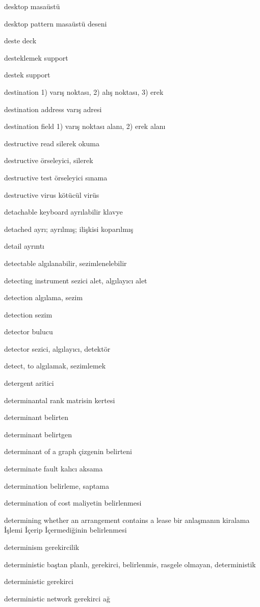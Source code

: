 \documentclass[12pt,fleqn]{article}\usepackage{../../common}
\begin{document}
desktop masaüstü

desktop pattern masaüstü deseni

deste deck

desteklemek support

destek support

destination 1) varış noktası, 2) alış noktası, 3) erek

destination address varış adresi

destination field 1) varış noktası alanı, 2) erek alanı

destructive read silerek okuma

destructive örseleyici, silerek

destructive test örseleyici sınama

destructive virus kötücül virüs

detachable keyboard ayrılabilir klavye

detached ayrı; ayrılmış; ilişkisi koparılmış

detail ayrıntı

detectable algılanabilir, sezimlenelebilir

detecting instrument sezici alet, algılayıcı alet

detection algılama, sezim

detection sezim

detector bulucu

detector sezici, algılayıcı, detektör

detect, to algılamak, sezimlemek

detergent aritici

determinantal rank matrisin kertesi

determinant belirten

determinant belirtgen

determinant of a graph çizgenin belirteni

determinate fault kalıcı aksama

determination belirleme, saptama

determination of cost maliyetin belirlenmesi

determining whether an arrangement contains a lease bir anlaşmanın kiralama İşlemi İçerip İçermediğinin belirlenmesi

determinism gerekircilik

deterministic baştan planlı, gerekirci, belirlenmis, rasgele olmayan, deterministik

deterministic gerekirci

deterministic network gerekirci ağ
\end{document}
